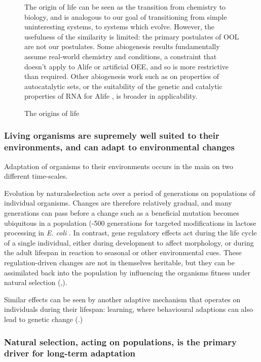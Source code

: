 \begin{figure}
\begin{framed}
The origin of life can be seen as the transition from chemistry to biology, and is analogous to our goal of transitioning from simple uninteresting systems, to systems which evolve. However, the usefulness of the similarity is limited: the primary postulates of OOL are not our postulates. Some abiogenesis results fundamentally assume real-world chemistry and
conditions, a constraint that doesn't apply to Alife or artificial OEE, and so is more restrictive than required. Other abiogenesis work such as on properties of autocatalytic sets, or the suitability of the genetic and catalytic properties of RNA for Alife \parencite{Cheng2010}, is broader in applicability.
\end{framed}
\captionsetup{name=Box}
\caption{The origins of life}
\label{box:ool}
\end{figure}

\subsubsection{Living organisms are supremely well suited to their environments, and can adapt to environmental changes}

Adaptation of organisms to their environments occurs in the main on two different time-scales.

Evolution by \gls{naturalselection} acts over a period of generations on populations of individual organisms. Changes are therefore relatively gradual, and many generations can pass before a change such as a beneficial mutation becomes ubiquitous in a population (-500 generations for targeted modifications in lactose processing in \emph{E. coli} \parencite{Dekel:2005fk}. In contrast, gene regulatory effects act during the life cycle of a single individual, either during development to affect morphology, or during the adult lifespan in reaction to seasonal or other environmental cues. These regulation-driven changes are not in themselves heritable, but they can be assimilated back into the population by influencing the organisms fitness under natural selection (\eg,\parencite{Baldwin:1896ly,Dennett:2003ve,Paenke:2009xe,Paenke:2007ve}).

Similar effects can be seen by another adaptive mechanism that operates on individuals during their lifespan: learning, where behavioural adaptions can also lead to genetic change (\eg \parencite{Hinton:1987vy}.)

\subsubsection{Natural selection, acting on populations, is the primary driver for long-term adaptation}

